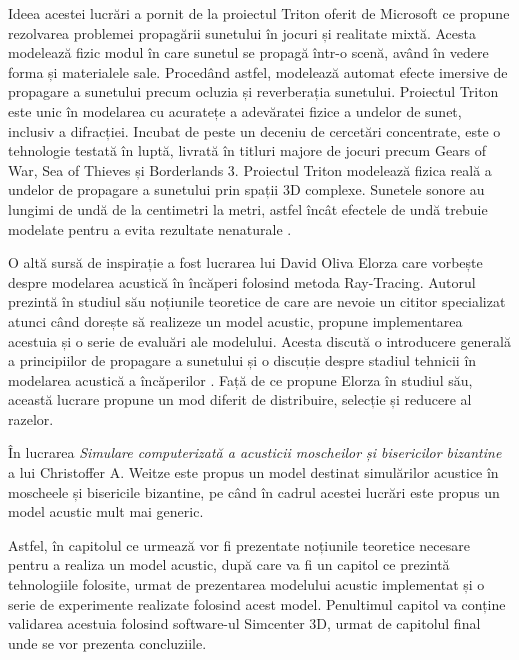 Ideea acestei lucrări a pornit de la proiectul Triton oferit de Microsoft ce propune rezolvarea problemei propagării sunetului în jocuri și realitate mixtă. Acesta modelează fizic modul în care sunetul se propagă într-o scenă, având în vedere forma și materialele sale. Procedând astfel, modelează automat efecte imersive de propagare a sunetului precum ocluzia și reverberația sunetului. Proiectul Triton este unic în modelarea cu acuratețe a adevăratei fizice a undelor de sunet, inclusiv a difracției. Incubat de peste un deceniu de cercetări concentrate, este o tehnologie testată în luptă, livrată în titluri majore de jocuri precum Gears of War, Sea of Thieves și Borderlands 3. Proiectul Triton modelează fizica reală a undelor de propagare a sunetului prin spații 3D complexe. Sunetele sonore au lungimi de undă de la centimetri la metri, astfel încât efectele de undă trebuie modelate pentru a evita rezultate nenaturale \cite{triton}.

O altă sursă de inspirație a fost lucrarea lui David Oliva Elorza care vorbește despre modelarea acustică în încăperi folosind metoda Ray-Tracing. Autorul prezintă în studiul său noțiunile teoretice de care are nevoie un cititor specializat atunci când dorește să realizeze un model acustic, propune implementarea acestuia și o serie de evaluări ale modelului. Acesta discută o introducere generală a principiilor de propagare a sunetului și o discuție despre stadiul tehnicii în modelarea acustică a încăperilor \cite{elorza}. Față de ce propune Elorza în studiul său, această lucrare propune un mod diferit de distribuire, selecție și reducere al razelor.

În lucrarea \textit{Simulare computerizată a acusticii moscheilor și bisericilor bizantine} a lui Christoffer A. Weitze \cite{chris} este propus un model destinat simulărilor acustice în moscheele și bisericile bizantine, pe când în cadrul acestei lucrări este propus un model acustic mult mai generic.

Astfel, în capitolul ce urmează vor fi prezentate noțiunile teoretice necesare pentru a realiza un model acustic, după care va fi un capitol ce prezintă tehnologiile folosite, urmat de prezentarea modelului acustic implementat și o serie de experimente realizate folosind acest model. Penultimul capitol va conține validarea acestuia folosind software-ul Simcenter 3D, urmat de capitolul final unde se vor prezenta concluziile.
